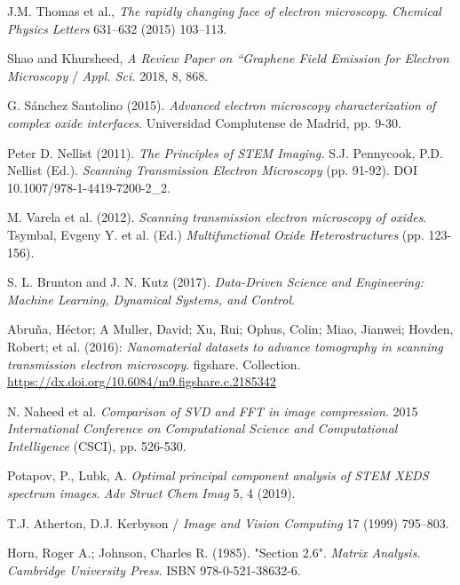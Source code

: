  \normalsize

\begin{thebibliography}{9}

J.M. Thomas et al., \textit{The rapidly changing face of electron microscopy}. \textit{Chemical Physics Letters} 631–632 (2015) 103–113.

Shao and Khursheed, \textit{A Review Paper on “Graphene Field Emission for Electron Microscopy} / \textit{Appl. Sci.} 2018, 8, 868.

G. Sánchez Santolino (2015). \textit{Advanced electron microscopy characterization of complex oxide interfaces}. Universidad Complutense de Madrid, pp. 9-30.

Peter D. Nellist (2011). \textit{The Principles of STEM Imaging.} S.J. Pennycook, P.D. Nellist (Ed.). \textit{Scanning Transmission Electron Microscopy }(pp. 91-92). DOI 10.1007/978-1-4419-7200-2\_2. 

M. Varela et al. (2012). \textit{Scanning transmission electron microscopy of oxides}. Tsymbal, Evgeny Y. et al. (Ed.) \textit{Multifunctional Oxide Heterostructures} (pp. 123-156).

S. L. Brunton and J. N. Kutz (2017). \textit{Data-Driven Science and Engineering: Machine Learning, Dynamical Systems, and Control}.

Abruña, Héctor; A Muller, David; Xu, Rui; Ophus, Colin; Miao, Jianwei; Hovden, Robert; et al. (2016): \textit{Nanomaterial datasets to advance tomography in scanning transmission electron microscopy}. figshare. Collection. \href{https://dx.doi.org/10.6084/m9.figshare.c.2185342}{https://dx.doi.org/10.6084/m9.figshare.c.2185342}

N. Naheed et al. \textit{Comparison of SVD and FFT in image compression}. 2015 \textit{International Conference on Computational Science and Computational Intelligence} (CSCI), pp. 526-530.

Potapov, P., Lubk, A. \textit{Optimal principal component analysis of STEM XEDS spectrum images}. \textit{Adv Struct Chem Imag} 5, 4 (2019). 

T.J. Atherton, D.J. Kerbyson / \textit{Image and Vision Computing} 17 (1999) 795–803.

Horn, Roger A.; Johnson, Charles R. (1985). "Section 2.6". \textit{Matrix Analysis. Cambridge University Press}. ISBN 978-0-521-38632-6.

\end{thebibliography}